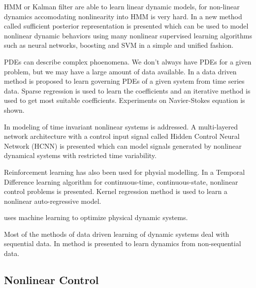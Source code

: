 \documentclass[conference]{IEEEtran}
\begin{document}
HMM or Kalman filter are able to learn linear dynamic models, for non-linear dynamics accomodating nonlinearity into HMM is very hard. In \cite{langford2009nonlinear} a new method called sufficient posterior representation is presented which can be used to model nonlinear dynamic behaviors using many nonlinear supervised learning algorithms such as neural networks, boosting and SVM in a simple and unified fashion.

PDEs can describe complex phoenomena. We don't always have PDEs for a given problem, but we may have a large amount of data available. In \cite{rudy2017datadriven} a data driven method is proposed to learn governing PDEs of a given system from time series data. Sparse regression is used to learn the coefficients and an iterative method is used to get most suitable coefficients. Experiments on Navier-Stokes equation is shown.

In \cite{levin1991nips} modeling of time invariant nonlinear systems is addressed. A multi-layered network architecture with a control input signal called Hidden Control Neural Network (HCNN) is presented which can model signals generated by nonlinear dynamical systems with restricted time variability.

Reinforcement learning has also been used for physial modelling. In \cite{doya1996nips} a Temporal Difference learning algorithm for continuous-time, continuous-state, nonlinear control problems is presented. Kernel regression method is used to learn a nonlinear auto-regressive model.

\cite{hermans2014automated} uses machine learning to optimize physical dynamic systems.

Most of the methods of data driven learning of dynamic systems deal with sequential data. In \cite{john2009nonlinear} method is presented to learn dynamics from non-sequential data.

\subsection{Nonlinear Control}

\cite{plett2003nn, kim2005nips, aboueldahab2011identification, levin1991nips, milito1991nips, lippmann1991nips, scott1992nips, HBZnips96, takashi2005nonlinear, sabino1999chaos, sergey2011nips, schnider1997nips, doya1997nips, rawlik2010nips, emanuel2009nips, li2015dynamic, watter2015nips, jordan1990nips, rivals2000nn, brown1998ICDC, susemihl2014nips, Mozer1996TheNP, deng2008feedback, chen2002ICDC, timothy1994nips, yu1996nips}
\end{document}
